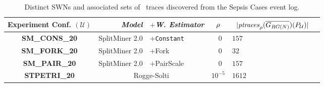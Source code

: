 \begin{table}[!t]
\caption{Distinct SWNs and associated sets of \unravelled\ traces discovered from the Sepsis Cases event log.}\label{tab:dataset}
\centering
 \begin{adjustbox}{width=.6\textwidth}
	\begin{tabular}{crl||cl|c}
		\toprule
		\textbf{Experiment Conf.} $(\mathcal{U})$ & \textit{Model} & $+$\textit{W. Estimator} & $\pmin$& $\;\;|\WCal{\pmin}{n}(P_{\mathcal{U}})|$ \\
		\midrule
		
		\textbf{SM\_CONS\_20} &SplitMiner 2.0  \cite{AugustoCDRP19}       & +\texttt{Constant} &  $\;\;0$ & $157$  \\
		
		\textbf{SM\_FORK\_20} & SplitMiner 2.0  \cite{AugustoCDRP19}      & +Fork \cite{spdwe} &  $\;\;0$ & $32$  \\
		
		
		\textbf{SM\_PAIR\_20} & SplitMiner 2.0  \cite{AugustoCDRP19}      & +PairScale \cite{spdwe} &  $\;\;0$ & $157$ \\

		\textbf{STPETRI\_20} & \multicolumn{2}{c||}{Rogge-Solti \cite{RoggeSoltiAW13}} &  $10^{-5}$ & $1612$ \\
		\bottomrule
	\end{tabular}
\end{adjustbox}
\vspace{-.8cm}
\end{table}


